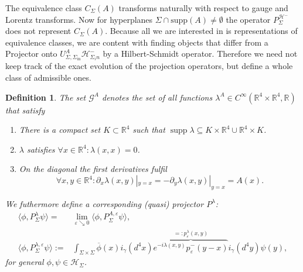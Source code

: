 \documentclass[b5paper,draft,openbib,12pt]{memoir}
\newtheorem{Def}{Definition}
\DeclareMathOperator*{\supp}{supp}
\begin{document}
The equivalence class \(C_\Sigma(A)\) transforms naturally with respect to gauge and Lorentz transforms\cite{ivp2}. 
Now for hyperplanes \(\Sigma\cap \text{supp}(A)\neq \emptyset\) the operator \(P^{\mathcal{H}^-}_{\Sigma} \) does not represent
\(C_\Sigma(A)\). Because all we are interested in is representations of equivalence classes, we are content with finding
objects that differ from a Projector onto \(U_{\Sigma,\Sigma_{\text{in}}}^A \mathcal{H}_{\Sigma_in}^-\) by a Hilbert-Schmidt operator.
Therefore we need not keep track of the exact evolution of the projection operators, but define a whole class of admissible ones.

\begin{Def}\label{def:lambda}
The set \(\mathcal{G}^A\) denotes the set of all functions \(\lambda^A \in C^\infty (\mathbb{R}^4\times \mathbb{R}^4, \mathbb{R})\) that satisfy
\begin{enumerate}[label= \roman*) ]
\item There is a compact set \(K\subset \mathbb{R}^4\) such that \(\supp \lambda \subseteq K\times \mathbb{R}^4 \cup \mathbb{R}^4 \times K\).
\item \(\lambda\) satisfies \(\forall x \in \mathbb{R}^4: \lambda(x,x)=0\).
\item On the diagonal the first derivatives fulfil 
\begin{equation}
\forall x,y\in\mathbb{R}^4: \partial_x \lambda(x,y)|_{y=x}=-\partial_y \lambda(x,y)|_{y=x} = A(x).
\end{equation}
\end{enumerate}
We futhermore define a corresponding (quasi) projector \(P^\lambda\):
\begin{align}
\langle \phi, P^\lambda_\Sigma \psi\rangle =& \lim_{\varepsilon \searrow 0} \langle \phi, P^{A,\varepsilon}_\Sigma \psi\rangle ,\\\label{def:p lambda}
\langle \phi, P^{\lambda,\varepsilon}_\Sigma \psi\rangle :=&
\int_{\Sigma\times\Sigma}\overline{\phi}(x)i_\gamma(d^4x) 
\overbrace{e^{-i \lambda(x,y)} p^-_\varepsilon(y-x)}^{=:p^\lambda_\varepsilon(x,y)}i_\gamma(d^4y) \psi(y),
\end{align}
for general \(\phi, \psi \in \mathcal{H}_\Sigma\).
\end{Def}
\end{document}
